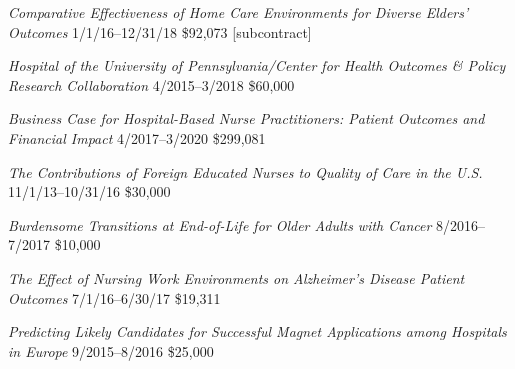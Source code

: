 \documentclass[10pt,]{article}
\begin{document}
{{{{{{{{{{{{{\textit {Comparative Effectiveness of Home Care Environments for Diverse Elders’ Outcomes} \hfill 1/1/16--12/31/18 \newline
{}	\hfill \$92,073 [subcontract]

\textit {Hospital of the University of Pennsylvania/Center for Health Outcomes \& Policy Research Collaboration} \hfill 4/2015--3/2018 \newline
{}		\hfill \$60,000

\textit {Business Case for Hospital-Based Nurse Practitioners: Patient Outcomes and Financial Impact} \hfill 4/2017--3/2020 \newline
{}	\hfill \$299,081

\textit {The Contributions of Foreign Educated Nurses to Quality of Care in the U.S.} \hfill 11/1/13--10/31/16 \newline
{}	\hfill \$30,000

\textit {Burdensome Transitions at End-of-Life for Older Adults with Cancer} \hfill 8/2016--7/2017 \newline
{}	\hfill \$10,000

\textit {The Effect of Nursing Work Environments on Alzheimer’s Disease Patient Outcomes} \hfill 7/1/16--6/30/17 \newline
{}	\hfill \$19,311

\textit {Predicting Likely Candidates for Successful Magnet Applications among Hospitals in Europe} \hfill  9/2015--8/2016 \newline
{} \hfill \$25,000

}}}}}}}}}}}}}
\end{document}
